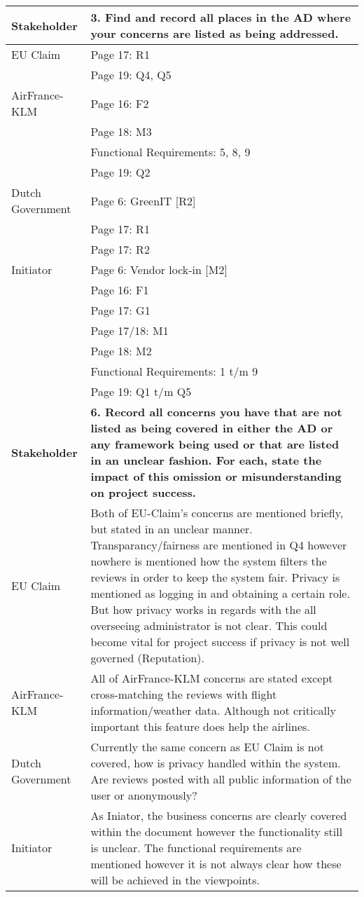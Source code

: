 \begin{longtable}{| l | p{13cm} |}
  \hline
  \textbf{Stakeholder} & \textbf{3. Find and record all places in the AD where your concerns are listed as being addressed.} \\
  \hline
  EU Claim & Page 17: R1\\ 
& Page 19: Q4, Q5 \\
  \hline
  AirFrance-KLM & Page 16: F2 \\
    & Page 18: M3 \\
    & Functional Requirements: 5, 8, 9 \\
    & Page 19: Q2\\
  \hline
  Dutch Government & Page 6: GreenIT [R2] \\
    &Page 17: R1\\
    &Page 17: R2 \\
  \hline
  Initiator & Page 6: Vendor lock-in [M2] \\
    & Page 16: F1 \\
    & Page 17: G1 \\
    & Page 17/18: M1 \\
    & Page 18: M2 \\
    & Functional Requirements: 1 t/m 9 \\
    & Page 19: Q1 t/m Q5\\
  \hline

  \hline
  \textbf{Stakeholder} & \textbf{6. Record all concerns you have that are not listed as being covered in either the AD or any framework being used or that are listed in an unclear fashion. For each, state the impact of this omission or misunderstanding on project success.} \\
  \hline
  EU Claim & Both of EU-Claim's concerns are mentioned briefly, but stated in an unclear manner. Transparancy/fairness are mentioned in Q4 however nowhere is mentioned how the system filters the reviews in order to keep the system fair. Privacy is mentioned as logging in and obtaining a certain role. But how privacy works in regards with the all overseeing administrator is not clear. This could become vital for project success if privacy is not well governed (Reputation). \\
  \hline
  AirFrance-KLM & All of AirFrance-KLM concerns are stated except cross-matching the reviews with flight information/weather data. Although not critically important this feature does help the airlines.\\
  \hline
  Dutch Government & Currently the same concern as EU Claim is not covered, how is privacy handled within the system. Are reviews posted with all public information of the user or anonymously? \\
  \hline
  Initiator & As Iniator, the business concerns are clearly covered within the document however the functionality still is unclear. The functional requirements are mentioned however it is not always clear how these will be achieved in the viewpoints. \\
  \hline


\end{longtable}
